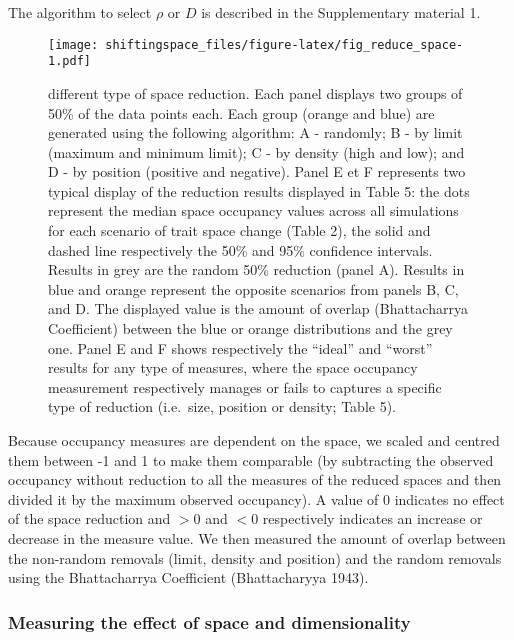 \documentclass[]{article}
\begin{document}
The algorithm to select \(\rho\) or \(D\) is described in the
Supplementary material 1.

\renewcommand\baselinestretch{1}\selectfont

\begin{figure}
\centering
\texttt{[image: shiftingspace\_files/figure-latex/fig\_reduce\_space-1.pdf]}
\caption{\small{different type of space reduction. Each panel displays two
groups of 50\% of the data points each. Each group (orange and blue) are
generated using the following algorithm: A - randomly; B - by limit
(maximum and minimum limit); C - by density (high and low); and D - by
position (positive and negative). Panel E et F represents two typical
display of the reduction results displayed in Table 5: the dots
represent the median space occupancy values across all simulations for
each scenario of trait space change (Table 2), the solid and dashed line
respectively the 50\% and 95\% confidence intervals. Results in grey are
the random 50\% reduction (panel A). Results in blue and orange
represent the opposite scenarios from panels B, C, and D. The displayed
value is the amount of overlap (Bhattacharrya Coefficient) between the
blue or orange distributions and the grey one. Panel E and F shows
respectively the ``ideal'' and ``worst'' results for any type of
measures, where the space occupancy measurement respectively manages or
fails to captures a specific type of reduction (i.e.~size, position or
density; Table 5).}}
\end{figure}

\renewcommand\baselinestretch{1.6}\selectfont

Because occupancy measures are dependent on the space, we scaled and
centred them between -1 and 1 to make them comparable (by subtracting
the observed occupancy without reduction to all the measures of the
reduced spaces and then divided it by the maximum observed occupancy). A
value of 0 indicates no effect of the space reduction and \(>0\) and
\(<0\) respectively indicates an increase or decrease in the measure
value. We then measured the amount of overlap between the non-random
removals (limit, density and position) and the random removals using the
Bhattacharrya Coefficient (Bhattacharyya 1943).

\subsubsection{Measuring the effect of space and
dimensionality}\label{measuring-the-effect-of-space-and-dimensionality}
\end{document}
